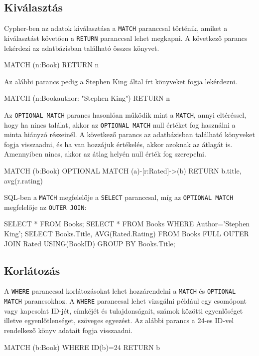 \subsection{Kiválasztás}
Cypher-ben az adatok kiválasztása a \texttt{MATCH} paranccsal történik, amiket a kiválasztást követően a \texttt{RETURN} paranccsal lehet megkapni. A következő parancs lekérdezi az adatbázisban található összes könyvet.
\begin{java}
MATCH (n:Book) RETURN n
\end{java}
Az alábbi parancs pedig a Stephen King által írt könyveket fogja lekérdezni.
\begin{java}
MATCH (n:Book{author: "Stephen King"}) RETURN n
\end{java}
Az \texttt{OPTIONAL MATCH} parancs hasonlóan működik mint a \texttt{MATCH}, annyi eltéréssel, hogy ha nincs találat, akkor az \texttt{OPTIONAL MATCH} null értéket fog használni a minta hiányzó részeinél. A következő parancs az adatbázisban található könyveket fogja visszaadni, és ha van hozzájuk értékelés, akkor azoknak az átlagát is. Amennyiben nincs, akkor az átlag helyén null érték fog szerepelni.
\begin{java}
MATCH (b:Book) 
OPTIONAL MATCH (a)-[r:Rated]->(b) 
RETURN b.title, avg(r.rating)
\end{java}
SQL-ben a \texttt{MATCH} megfelelője a \texttt{SELECT} paranccsal, míg az \texttt{OPTIONAL MATCH} megfelelője az \texttt{OUTER JOIN}:
\begin{java}
SELECT * FROM Books;
SELECT * FROM Books WHERE Author='Stephen King';
SELECT Books.Title, AVG(Rated.Rating) FROM Books 
FULL OUTER JOIN Rated USING(BookID) GROUP BY Books.Title;
\end{java}

\subsection{Korlátozás}
A \texttt{WHERE} paranccsal korlátozásokat lehet hozzárendelni a \texttt{MATCH} és \texttt{OPTIONAL MATCH} parancsokhoz. A \texttt{WHERE} paranccsal lehet vizsgálni például egy csomópont vagy kapcsolat ID-jét, címkéjét és tulajdonságait, számok közötti egyenlőséget illetve egyenlőtlenséget, szöveges egyezést. Az alábbi parancs a 24-es ID-vel rendelkező könyv adatait fogja visszaadni.
\begin{java}
MATCH (b:Book) 
WHERE ID(b)=24
RETURN b
\end{java}

